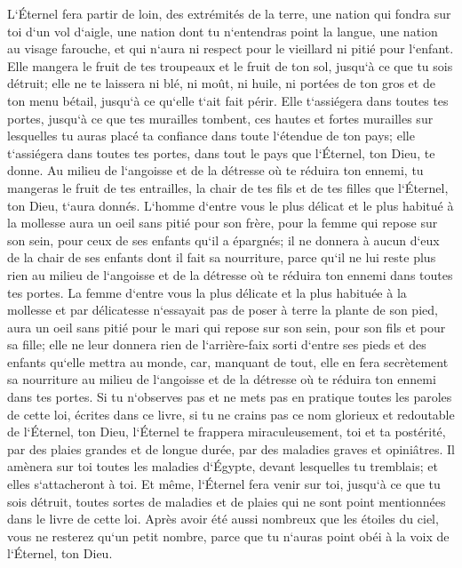 \verse L`Éternel fera partir de loin, des extrémités de la terre, une nation qui fondra sur toi d`un vol d`aigle, une nation dont tu n`entendras point la langue, 
\verse une nation au visage farouche, et qui n`aura ni respect pour le vieillard ni pitié pour l`enfant. 
\verse Elle mangera le fruit de tes troupeaux et le fruit de ton sol, jusqu`à ce que tu sois détruit; elle ne te laissera ni blé, ni moût, ni huile, ni portées de ton gros et de ton menu bétail, jusqu`à ce qu`elle t`ait fait périr. 
\verse Elle t`assiégera dans toutes tes portes, jusqu`à ce que tes murailles tombent, ces hautes et fortes murailles sur lesquelles tu auras placé ta confiance dans toute l`étendue de ton pays; elle t`assiégera dans toutes tes portes, dans tout le pays que l`Éternel, ton Dieu, te donne. 
\verse Au milieu de l`angoisse et de la détresse où te réduira ton ennemi, tu mangeras le fruit de tes entrailles, la chair de tes fils et de tes filles que l`Éternel, ton Dieu, t`aura donnés. 
\verse L`homme d`entre vous le plus délicat et le plus habitué à la mollesse aura un oeil sans pitié pour son frère, pour la femme qui repose sur son sein, pour ceux de ses enfants qu`il a épargnés; 
\verse il ne donnera à aucun d`eux de la chair de ses enfants dont il fait sa nourriture, parce qu`il ne lui reste plus rien au milieu de l`angoisse et de la détresse où te réduira ton ennemi dans toutes tes portes. 
\verse La femme d`entre vous la plus délicate et la plus habituée à la mollesse et par délicatesse n`essayait pas de poser à terre la plante de son pied, aura un oeil sans pitié pour le mari qui repose sur son sein, pour son fils et pour sa fille; 
\verse elle ne leur donnera rien de l`arrière-faix sorti d`entre ses pieds et des enfants qu`elle mettra au monde, car, manquant de tout, elle en fera secrètement sa nourriture au milieu de l`angoisse et de la détresse où te réduira ton ennemi dans tes portes. 
\verse Si tu n`observes pas et ne mets pas en pratique toutes les paroles de cette loi, écrites dans ce livre, si tu ne crains pas ce nom glorieux et redoutable de l`Éternel, ton Dieu, 
\verse l`Éternel te frappera miraculeusement, toi et ta postérité, par des plaies grandes et de longue durée, par des maladies graves et opiniâtres. 
\verse Il amènera sur toi toutes les maladies d`Égypte, devant lesquelles tu tremblais; et elles s`attacheront à toi. 
\verse Et même, l`Éternel fera venir sur toi, jusqu`à ce que tu sois détruit, toutes sortes de maladies et de plaies qui ne sont point mentionnées dans le livre de cette loi. 
\verse Après avoir été aussi nombreux que les étoiles du ciel, vous ne resterez qu`un petit nombre, parce que tu n`auras point obéi à la voix de l`Éternel, ton Dieu. 
